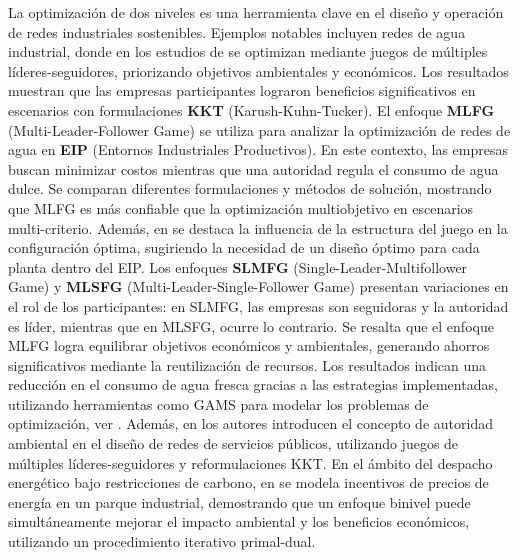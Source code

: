 La optimización de dos niveles es una herramienta clave en el diseño y operación de redes industriales sostenibles. Ejemplos notables incluyen redes de agua industrial, 
donde en los estudios de \cite{Ramos2016WaterII} se optimizan mediante juegos de múltiples líderes-seguidores, priorizando objetivos ambientales y económicos. Los resultados muestran que las empresas participantes lograron beneficios significativos en escenarios con formulaciones \textbf{KKT} (Karush-Kuhn-Tucker). 
El enfoque \textbf{MLFG} (Multi-Leader-Follower Game) se utiliza para analizar la optimización de redes de agua en \textbf{EIP} (Entornos Industriales Productivos). En este contexto, las empresas buscan minimizar costos mientras que una autoridad regula el consumo de agua dulce. Se comparan diferentes formulaciones y métodos de solución, mostrando que MLFG es más confiable que la optimización multiobjetivo en escenarios multi-criterio. Además, en \cite{Ramos2016WaterII} se destaca la influencia de la estructura del juego en la configuración óptima, sugiriendo la necesidad de un diseño óptimo para cada planta dentro del EIP. 
Los enfoques \textbf{SLMFG} (Single-Leader-Multifollower Game) y \textbf{MLSFG} (Multi-Leader-Single-Follower Game) presentan variaciones en el rol de los participantes: en SLMFG, las empresas son seguidoras y la autoridad es líder, mientras que en MLSFG, ocurre lo contrario. Se resalta que el enfoque MLFG logra equilibrar objetivos económicos y ambientales, generando ahorros significativos mediante la reutilización de recursos. Los resultados indican una reducción en el consumo de agua fresca gracias a las estrategias implementadas, utilizando herramientas como GAMS para modelar los problemas de optimización, ver \cite{Ramos2016WaterII}. 
Además, en \cite{Ramos2018UtilityNO} los autores introducen el concepto de autoridad ambiental en el diseño de redes de servicios públicos, utilizando juegos de múltiples líderes-seguidores y reformulaciones KKT. 
En el ámbito del despacho energético bajo restricciones de carbono, en \cite{Gu2020BilevelOL} se modela incentivos de precios de energía en un parque industrial, demostrando que un enfoque binivel puede simultáneamente mejorar el impacto ambiental y los beneficios económicos, utilizando un procedimiento iterativo primal-dual.

